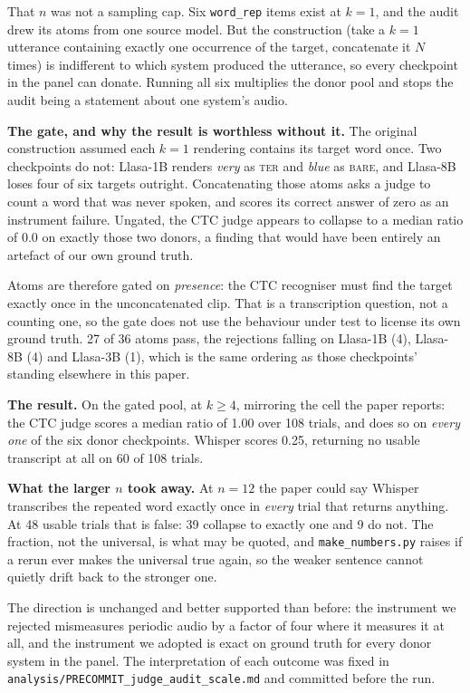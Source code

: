 \documentclass[11pt]{article}
\begin{document}
That $n$ was not a sampling cap. Six \texttt{word\_rep} items exist at $k{=}1$,
and the audit drew its atoms from one source model. But the construction (take
a $k{=}1$ utterance containing exactly one occurrence of the target, concatenate
it $N$ times) is indifferent to which system produced the utterance, so every
checkpoint in the panel can donate. Running all six multiplies the donor pool and
stops the audit being a statement about one system's audio.

\textbf{The gate, and why the result is worthless without it.} The original
construction assumed each $k{=}1$ rendering contains its target word once. Two
checkpoints do not: Llasa-1B renders \emph{very} as \textsc{ter} and \emph{blue}
as \textsc{bare}, and Llasa-8B loses four of six targets outright. Concatenating
those atoms asks a judge to count a word that was never spoken, and scores its
correct answer of zero as an instrument failure. Ungated, the CTC judge appears
to collapse to a median ratio of $0.0$ on exactly those two donors, a
finding that would have been entirely an artefact of our own ground truth.

Atoms are therefore gated on \emph{presence}: the CTC recogniser must find the
target exactly once in the unconcatenated clip. That is a transcription question,
not a counting one, so the gate does not use the behaviour under test to license
its own ground truth. 27 of 36 atoms
pass, the rejections falling on Llasa-1B (4), Llasa-8B (4) and Llasa-3B (1),
which is the same ordering as those checkpoints' standing elsewhere in this
paper.

\textbf{The result.} On the gated pool, at $k\ge4$, mirroring the cell the paper
reports: the CTC judge scores a median ratio of 1.00 over
108 trials, and does so on \emph{every one} of the six donor
checkpoints. Whisper scores 0.25, returning no usable
transcript at all on 60 of 108
trials.

\textbf{What the larger $n$ took away.} At $n{=}12$ the paper could say Whisper
transcribes the repeated word exactly once in \emph{every} trial that returns
anything. At 48 usable trials that is false:
39 collapse to exactly one and
9 do not. The fraction, not the universal, is
what may be quoted, and \texttt{make\_numbers.py} raises if a rerun ever
makes the universal true again, so the weaker sentence cannot quietly drift back
to the stronger one.

The direction is unchanged and better supported than before: the instrument we
rejected mismeasures periodic audio by a factor of four where it measures it at
all, and the instrument we adopted is exact on ground truth for every donor
system in the panel. The interpretation of each outcome was fixed in
\texttt{analysis/PRECOMMIT\_judge\_audit\_scale.md} and committed before the run.
\end{document}
